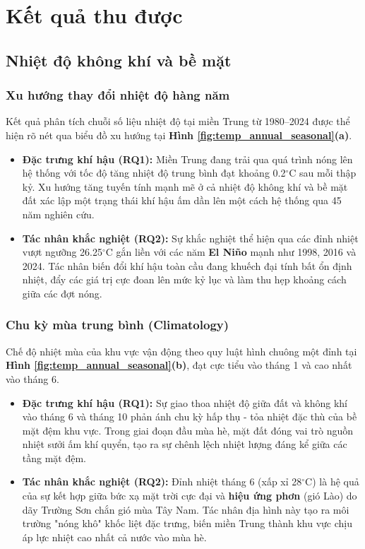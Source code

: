 \documentclass[12pt,a4paper]{article}
\begin{document}
\section{Kết quả thu được}

\subsection{Nhiệt độ không khí và bề mặt}

\subsubsection{Xu hướng thay đổi nhiệt độ hàng năm}
Kết quả phân tích chuỗi số liệu nhiệt độ tại miền Trung từ 1980--2024 được thể hiện rõ nét qua biểu đồ xu hướng tại \textbf{Hình \ref{fig:temp_annual_seasonal}(a)}. 

\begin{itemize}
    \item \textbf{Đặc trưng khí hậu (RQ1):} Miền Trung đang trải qua quá trình nóng lên hệ thống với tốc độ tăng nhiệt độ trung bình đạt khoảng 0.2$^\circ$C sau mỗi thập kỷ. Xu hướng tăng tuyến tính mạnh mẽ ở cả nhiệt độ không khí và bề mặt đất xác lập một trạng thái khí hậu ấm dần lên một cách hệ thống qua 45 năm nghiên cứu.
    \item \textbf{Tác nhân khắc nghiệt (RQ2):} Sự khắc nghiệt thể hiện qua các đỉnh nhiệt vượt ngưỡng 26.25$^\circ$C gắn liền với các năm \textbf{El Niño} mạnh như 1998, 2016 và 2024. Tác nhân biến đổi khí hậu toàn cầu đang khuếch đại tính bất ổn định nhiệt, đẩy các giá trị cực đoan lên mức kỷ lục và làm thu hẹp khoảng cách giữa các đợt nóng.
\end{itemize}

\subsubsection{Chu kỳ mùa trung bình (Climatology)}
Chế độ nhiệt mùa của khu vực vận động theo quy luật hình chuông một đỉnh tại \textbf{Hình \ref{fig:temp_annual_seasonal}(b)}, đạt cực tiểu vào tháng 1 và cao nhất vào tháng 6. 

\begin{itemize}
    \item \textbf{Đặc trưng khí hậu (RQ1):} Sự giao thoa nhiệt độ giữa đất và không khí vào tháng 6 và tháng 10 phản ánh chu kỳ hấp thụ - tỏa nhiệt đặc thù của bề mặt đệm khu vực. Trong giai đoạn đầu mùa hè, mặt đất đóng vai trò nguồn nhiệt sưởi ấm khí quyển, tạo ra sự chênh lệch nhiệt lượng đáng kể giữa các tầng mặt đệm.
    \item \textbf{Tác nhân khắc nghiệt (RQ2):} Đỉnh nhiệt tháng 6 (xấp xỉ 28$^\circ$C) là hệ quả của sự kết hợp giữa bức xạ mặt trời cực đại và \textbf{hiệu ứng phơn} (gió Lào) do dãy Trường Sơn chắn gió mùa Tây Nam. Tác nhân địa hình này tạo ra môi trường "nóng khô" khốc liệt đặc trưng, biến miền Trung thành khu vực chịu áp lực nhiệt cao nhất cả nước vào mùa hè.
\end{itemize}
\end{document}
